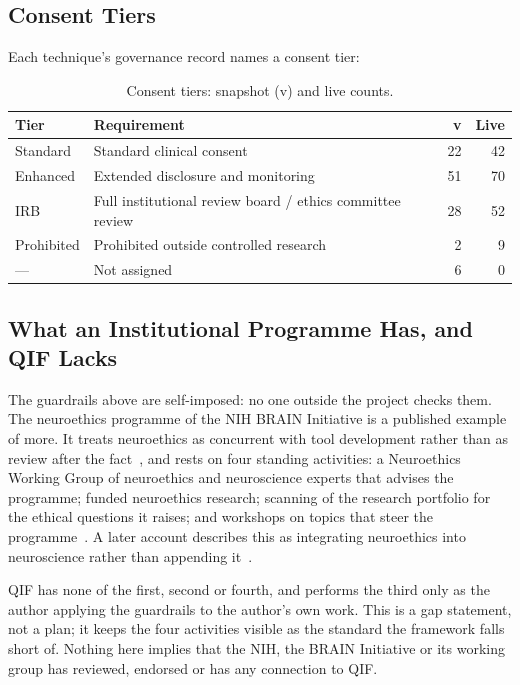 \subsection{Consent Tiers}

Each technique's governance record names a consent tier:

\begin{table}[H]
\centering
\caption{Consent tiers: snapshot (v\SnapshotRegistryVersion{}) and live counts.}
\label{tab:consent}
\small
\begin{tabularx}{\textwidth}{@{}l X r r@{}}
\toprule
\textbf{Tier} & \textbf{Requirement} & \textbf{v\SnapshotRegistryVersion{}} & \textbf{Live} \\
\midrule
Standard   & Standard clinical consent                         & 22 & 42 \\
Enhanced   & Extended disclosure and monitoring                & 51 & 70 \\
IRB        & Full institutional review board / ethics committee review & 28 & 52 \\
Prohibited & Prohibited outside controlled research            & 2  & 9 \\
---        & Not assigned                                      & 6  & 0 \\
\bottomrule
\end{tabularx}
\end{table}

\subsection{What an Institutional Programme Has, and QIF Lacks}

The guardrails above are self-imposed: no one outside the project checks them. The
neuroethics programme of the NIH BRAIN Initiative is a published example of more. It treats
neuroethics as concurrent with tool development rather than as review after the
fact~\cite{ramos2017brainneuroethics}, and rests on four standing activities: a Neuroethics
Working Group of neuroethics and neuroscience experts that advises the programme; funded
neuroethics research; scanning of the research portfolio for the ethical questions it
raises; and workshops on topics that steer the programme~\cite{bianchi2018brainneuroethics}.
A later account describes this as integrating neuroethics into neuroscience rather than
appending it~\cite{ramos2019brainintegrating}.

QIF has none of the first, second or fourth, and performs the third only as the author
applying the guardrails to the author's own work. This is a gap statement, not a plan; it
keeps the four activities visible as the standard the framework falls short of. Nothing here
implies that the NIH, the BRAIN Initiative or its working group has reviewed, endorsed or has
any connection to QIF.

